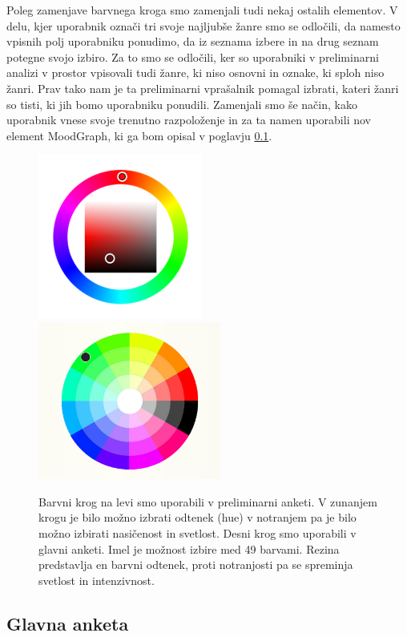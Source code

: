\documentclass[a4paper, 12pt]{book}
\begin{document}
{Poleg zamenjave barvnega kroga smo zamenjali tudi nekaj ostalih elementov. V delu, kjer uporabnik označi tri svoje najljubše žanre smo se odločili, da namesto vpisnih polj uporabniku ponudimo, da iz seznama izbere in na drug seznam potegne svojo izbiro. Za to smo se odločili, ker so uporabniki v preliminarni analizi v prostor vpisovali tudi žanre, ki niso osnovni in oznake, ki sploh niso žanri. Prav tako nam je ta preliminarni vprašalnik pomagal izbrati, kateri žanri so tisti, ki jih bomo uporabniku ponudili. Zamenjali smo še način, kako uporabnik vnese svoje trenutno razpoloženje in za ta namen uporabili nov element MoodGraph, ki ga bom opisal v poglavju \ref{glavnaanketa}. 

\begin{figure}[ht]
\centering
\includegraphics[width=54mm]{colorwheelold.png}
\includegraphics[width=60mm]{colorwheel.png}

\caption{Barvni krog na levi smo uporabili v preliminarni anketi. V zunanjem krogu je bilo možno izbrati odtenek (hue) v notranjem pa je bilo možno izbirati nasičenost in svetlost. Desni krog smo uporabili v glavni anketi. Imel je možnost izbire med 49 barvami. Rezina predstavlja en barvni odtenek, proti notranjosti pa se spreminja svetlost in intenzivnost. }
\label{colorwheels}
\end{figure}

\subsection{Glavna anketa}
\label{glavnaanketa}

}
\end{document}
